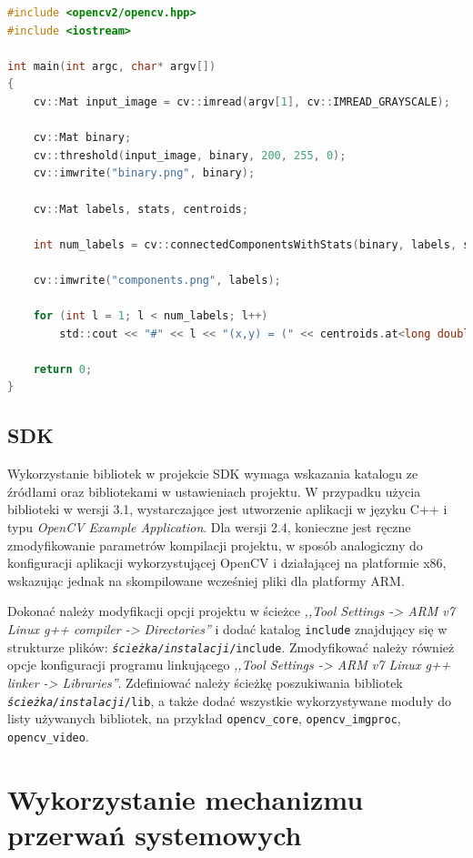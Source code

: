 \begin{lstlisting}[language=C, breaklines=true, label=lis:opencv-con-com, caption=Aplikacja indeksująca obiekty pierwszoplanowe.]
#include <opencv2/opencv.hpp>
#include <iostream>

int main(int argc, char* argv[])
{
	cv::Mat input_image = cv::imread(argv[1], cv::IMREAD_GRAYSCALE);
	
	cv::Mat binary;
	cv::threshold(input_image, binary, 200, 255, 0);
	cv::imwrite("binary.png", binary);
	
	cv::Mat labels, stats, centroids;
	
	int num_labels = cv::connectedComponentsWithStats(binary, labels, stats, centroids);
	
	cv::imwrite("components.png", labels);
	
	for (int l = 1; l < num_labels; l++)
		std::cout << "#" << l << "(x,y) = (" << centroids.at<long double>(l, 0) << ", " << centroids.at<long double>(l, 1) << ")" << std::endl;
	
	return 0;
}
\end{lstlisting}
\subsection{SDK}
Wykorzystanie bibliotek w projekcie SDK wymaga wskazania katalogu ze źródłami oraz bibliotekami w ustawieniach projektu.
W przypadku użycia biblioteki w wersji 3.1, wystarczające jest utworzenie aplikacji w języku C++ i typu \textit{OpenCV Example Application}.
Dla wersji 2.4, konieczne jest ręczne zmodyfikowanie parametrów kompilacji projektu, w sposób analogiczny do konfiguracji aplikacji wykorzystującej OpenCV i działającej na platformie x86, wskazując jednak na skompilowane wcześniej pliki dla platformy ARM.


Dokonać należy modyfikacji opcji projektu w ścieżce \emph{,,Tool Settings -> ARM v7 Linux g++ compiler -> Directories''} i dodać katalog \texttt{include} znajdujący się w strukturze plików: \texttt{\textit{ścieżka/instalacji}/include}.
Zmodyfikować należy również opcje konfiguracji programu linkującego \emph{,,Tool Settings -> ARM v7 Linux g++ linker -> Libraries''}. 
Zdefiniować należy ścieżkę poszukiwania bibliotek \texttt{\textit{ścieżka/instalacji}/lib}, a także dodać wszystkie wykorzystywane moduły do listy używanych bibliotek, na przykład \texttt{opencv\_core}, \texttt{opencv\_imgproc}, \texttt{opencv\_video}.

\section{Wykorzystanie mechanizmu przerwań systemowych}
\label{sec:interrupts-config}

